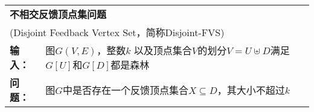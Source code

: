 \begin{tabular}{ | p{0.06\headwidth} p{0.80\headwidth} | }
  \hline
  \multicolumn{2}{|l|}{ \textbf{不相交反馈顶点集问题} }\\
  \multicolumn{2}{|l|}{ (Disjoint Feedback Vertex Set，简称Disjoint-FVS)}\\
  \textbf{输入：} & 图$G(V, E)$，整数$k$ 以及顶点集合$V$的划分$V = U \uplus D$满足$G[U]$和$G[D]$都是森林\\
  \textbf{问题：} & 图$G$中是否存在一个反馈顶点集合$X \subseteq D$，其大小不超过$k$\\
  \hline
\end{tabular} \vspace{0.5cm}


